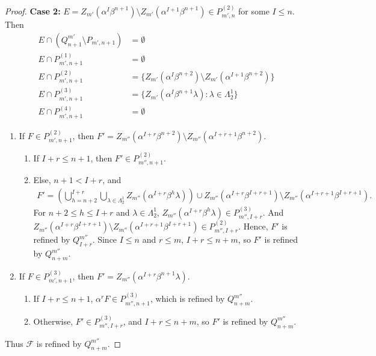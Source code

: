 \documentclass[10pt,a4paper]{amsart}
\newcommand{\La}{\Lambda}
\newcommand{\al}{\alpha}
\newcommand{\be}{\beta}
\newcommand{\emp}{\emptyset}
\newcommand{\la}{\lambda}
\newcommand{\mc}[1]{\mathcal{#1}}
\newcommand{\sm}{\setminus}
\begin{document}
\begin{proof}
    \textbf{Case 2:} $E = Z_{m'}(\al^{I}\be^{n+1}) \sm Z_{m'}(\al^{I+1}\be^{n+1}) \in P_{m',n}^{(2)}$ for some $I \leq n$. Then
    \begin{align*}
        E \cap (Q^{m'}_{n+1} \sm P_{m', n+1}) &= \emp\\
        E \cap P^{(1)}_{m',n+1} &= \emp \\
        E \cap P^{(2)}_{m',n+1} &= \{ Z_{m'}(\al^{I}\be^{n+2}) \sm Z_{m'}(\al^{I+1} \be^{n+2}) \}\\
        E \cap P^{(3)}_{m',n+1} &= \{ Z_{m'}(\al^{I}\be^{n+1} \la) : \la \in \La_2^1\} \\
        E \cap P^{(4)}_{m',n+1} &= \emp
    \end{align*}
    \begin{enumerate}
        \item If $F \in P^{(2)}_{m',n+1}$, then $F' = Z_{m''}(\al^{I+r}\be^{n+2})\sm Z_{m''}(\al^{I+r+1}\be^{n+2})$.
    \begin{enumerate}
        \item If $I+r \leq n+1$, then $F' \in P^{(2)}_{m'', n+1}$.
        \item Else, $n+1 < I+r$, and \begin{align*}
            F' = \left(\bigcup_{h=n+2}^{I+r} \bigcup_{\la \in \La_2^1} Z_{m''}(\al^{I+r}\be^h \la) \right) \cup Z_{m''}(\al^{I+r} \be^{I+r+1}) \sm Z_{m''}(\al^{I+r+1}\be^{I+r+1}).
        \end{align*}
        For $n+2 \leq h \leq I+r$ and $\la \in \La_2^1$, $Z_{m''}(\al^{I+r}\be^h \la) \in P^{(3)}_{m'', I+r}$. And $Z_{m''}(\al^{I+r} \be^{I+r+1}) \sm Z_{m''}(\al^{I+r+1}\be^{I+r+1}) \in P^{(2)}_{m'', I+r}$. Hence, $F'$ is refined by $Q_{I+r}^{m''}$. Since $I \leq n$ and $r \leq m$, $I+r \leq n+m$, so $F'$ is refined by $Q^{m''}_{n+m}$.
    \end{enumerate}

    \item If $F \in P^{(3)}_{m',n+1}$, then $F' = Z_{m''}(\al^{I+r}\be^{n+1}\la)$.
    \begin{enumerate}
        \item If $I+r \leq n+1$, $\al^r F \in P^{(3)}_{m'', n+1}$, which is refined by $Q_{n+m}^{m''}$.
        
        \item Otherwise, $F' \in P_{m'', I+r}^{(3)}$, and $I+r \leq n+m$, so $F'$ is refined by $Q_{n+m}^{m''}$.
    \end{enumerate}
    \end{enumerate}
    Thus $\mc{F}$ is refined by $Q^{m''}_{n+m}$.


\end{proof}
\end{document}
